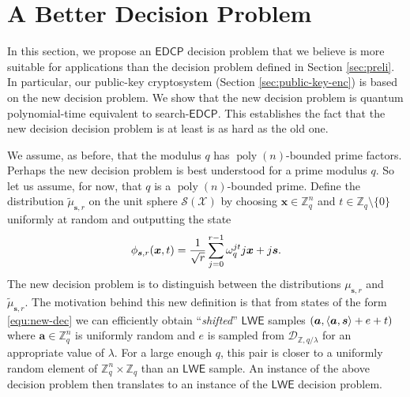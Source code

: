 \documentclass[11pt]{article}
\theoremstyle{plain}
\theoremstyle{definition}
\DeclareMathOperator{\poly}{poly}
\let\ket\relax
\DeclarePairedDelimiter{\ket}{\lvert}{\rangle}
\DeclarePairedDelimiter{\lrang}{\langle}{\rangle}
\def\Z{\mathbb{Z}}
\def\lwe{\mathsf{LWE}}
\def\edcp{\mathsf{EDCP}}
\def\SX{\mathcal{S(X)}}
\begin{document}



\section{A Better Decision Problem}
\label{sec:new-decsn}

In this section, we propose an $\edcp$ decision problem that we believe is more suitable for applications than the decision problem defined in Section \ref{sec:preli}. In particular, our public-key cryptosystem (Section \ref{sec:public-key-enc}) is based on the new decision problem. We show that the new decision problem is quantum polynomial-time equivalent to search-$\edcp$. This establishes the fact that the new decision decision problem is at least is as hard as the old one.

We assume, as before, that the modulus $q$ has $\poly(n)$-bounded prime factors. Perhaps the new decision problem is best understood for a prime modulus $q$. So let us assume, for now, that $q$ is a $\poly(n)$-bounded prime. Define the distribution $\tilde{\mu}_{\bm{s}, r}$ on the unit sphere $\SX$ by choosing $\bm{x} \in \Z_q^n$ and $t \in \Z_q {\setminus} \{ 0 \}$ uniformly at random and outputting the state
\begin{equation}
    \label{equ:new-dec}
    \ket{\phi_{\bm{s}, r}(\bm{x}, t)} = \frac{1}{\sqrt{r}} \sum_{j = 0}^{r - 1} \omega_q^{jt} \ket{j}\ket{\bm{x} + j\bm{s}}.
\end{equation}
The new decision problem is to distinguish between the distributions $\mu_{\bm{s}, r}$ and $\tilde{\mu}_{\bm{s}, r}$. The motivation behind this new definition is that from states of the form \eqref{equ:new-dec} we can efficiently obtain ``\textit{shifted}'' $\lwe$ samples $(\bm{a}, \lrang{\bm{a}, \bm{s}} + e + t)$ where $\bm{a} \in \Z_q^n$ is uniformly random and $e$ is sampled from $\mathcal{D}_{\Z, q / \lambda}$ for an appropriate value of $\lambda$. For a large enough $q$, this pair is closer to a uniformly random element of $\Z_q^n \times \Z_q$ than an $\lwe$ sample. An instance of the above decision problem then translates to an instance of the $\lwe$ decision problem.
\end{document}
